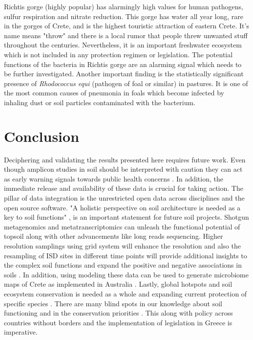 Richtis gorge (highly popular) has alarmingly high values for human pathogens, sulfur respiration and
nitrate reduction. This gorge has water all year long, rare in the gorges of Crete,
and is the highest touristic attraction of eastern Crete. It's name means "throw" and 
there is a local rumor that people threw unwanted stuff throughout the centuries. 
Nevertheless, it is an important freshwater ecosystem which is not included in 
any protection regimen or legislation.
The potential functions of the bacteria in Richtis gorge are an alarming signal which needs to be further investigated.
Another important finding is the statistically significant presence of \textit{Rhodococcus equi} (pathogen of foal or similar)
in pastures. It is one of the most common causes of pneumonia in foals which
become infected by inhaling dust or soil particles contaminated with the bacterium.

\section{Conclusion}

Deciphering and validating the results presented here requires future work.
Even though amplicon studies in soil should be interpreted with caution \parencite{alteio2021} they 
can act as early warning signals towards public health concerns \parencite{banerjee2023Soil}.
In addition, the immediate release and availability of these data is crucial for 
taking action.
The pillar of data integration is the unrestricted open data across disciplines and 
the open source software.
"A holistic perspective on soil architecture is needed as a key to soil functions" \parencite{philippot2024the-interplay}, is 
an important statement for future soil projects.
Shotgun metagenomics and metatranscriptomics can unleash the functional potential of
topsoil along with other advancements like long reads sequencing. Higher resolution
samplings using grid system will enhance the resolution and also the resampling of
ISD sites in different time points will provide additional insights to the complex soil 
functions and expand the positive and negative associations in soils \parencite{Liu2024}.
In addition, using modeling these data can be used to generate microbiome maps of Crete as 
implemented in Australia \parencite{Peipei2024drivers}.
Lastly, global hotspots \parencite{Guerra2022} and soil ecosystem conservation is needed as 
a whole and expanding current protection of specific species \parencite{guerra2021tracking}.
There are many blind spots in our knowledge about soil functioning and in the conservation
priorities \parencite{farfan2024preliminary}. 
This along with policy \parencite{KONINGER2022} across countries \parencite{Putten2023}
without borders and the implementation of legislation in Greece \parencite{SCHISMENOS2022100035} is 
imperative.


